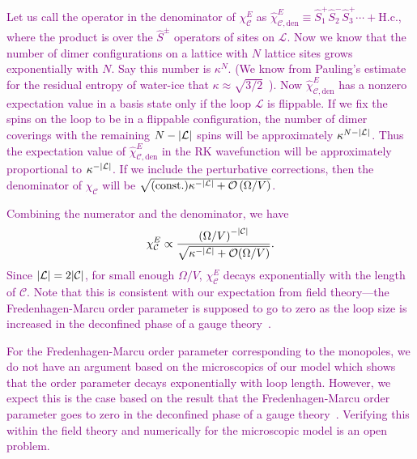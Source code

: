 \documentclass[twocolumn,superscriptaddress,amsmath,amssymb,aps,prx,nofootinbib]{revtex4-2}
\newcommand{\newtext}[1]{\textcolor{purple}{#1}}
\begin{document}
\newtext{Let us call the operator in the denominator of $\chi_\mathcal{C}^E$ as $\hat{\chi}_{\mathcal{C}, \text{den}}^E \equiv \hat{S}_1^+ \hat{S}_2^- \hat{S}_3^+\cdots + \text{H.c.}$, where the product is over the $\hat{S}^\pm$ operators of sites on $\mathcal{L}$. Now we know that the number of dimer configurations on a lattice with $N$ lattice sites grows exponentially with $N$. Say this number is $\kappa^N$. (We know from Pauling's estimate for the residual entropy of water-ice that $\kappa\approx \sqrt{3/2}$~\cite{pauling1935}). Now $\hat{\chi}_{\mathcal{C}, \text{den}}^E$ has a nonzero expectation value in a basis state only if the loop $\mathcal{L}$ is flippable. If we fix the spins on the loop to be in a flippable configuration, the number of dimer coverings with the remaining $N-\abs{\mathcal{L}}$ spins will be approximately $\kappa^{N-\abs{\mathcal{L}}}$. Thus the expectation value of $\hat{\chi}_{\mathcal{C}, \text{den}}^E$ in the RK wavefunction will be approximately proportional to $\kappa^{-\abs{\mathcal{L}}}$. If we include the perturbative corrections, then the denominator of $\chi_\mathcal{C}$ will be $\sqrt{(\text{const.}) \kappa^{-\abs{\mathcal{L}}} + \mathcal{O} \left( \Omega/V\right)}$. }

\newtext{Combining the numerator and the denominator, we have
\begin{equation}
    \chi_\mathcal{C}^E \propto \frac{\left(\Omega/V \right)^{-\abs{\mathcal{C}}}}{\sqrt{ \kappa^{-\abs{\mathcal{L}}} + \mathcal{O}(\Omega/V)}} .
\end{equation}
Since $\abs{\mathcal{L}} = 2 \abs{\mathcal{C}}$, for small enough $\Omega/V$, $\chi_\mathcal{C}^E$ decays exponentially with the length of $\mathcal{C}$. Note that this is consistent with our expectation from field theory---the Fredenhagen-Marcu order parameter is supposed to go to zero as the loop size is increased in the deconfined phase of a gauge theory~\cite{fredenhagen1983charged, fredenhagen1988dual}.}

\newtext{For the Fredenhagen-Marcu order parameter corresponding to the monopoles, we do not have an argument based on the microscopics of our model which shows that the order parameter decays exponentially with loop length. However, we expect this is the case based on the result that the Fredenhagen-Marcu order parameter goes to zero in the deconfined phase of a gauge theory~\cite{fredenhagen1983charged, fredenhagen1986, fredenhagen1988dual}. Verifying this within the field theory and numerically for the microscopic model is an open problem.}
\end{document}
